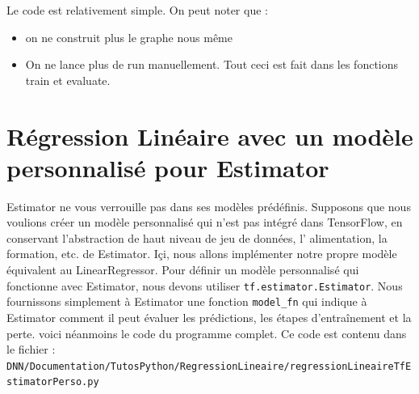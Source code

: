 Le code est relativement simple. On peut noter que :
\begin{itemize}
\item on ne construit plus le graphe nous même
\item On ne lance plus de run manuellement. Tout ceci est fait dans les fonctions train et evaluate.
\end{itemize}

\section{Régression Linéaire avec un modèle personnalisé pour Estimator}
Estimator ne vous verrouille pas dans ses modèles prédéfinis. Supposons que nous voulions créer un modèle personnalisé qui n'est pas intégré dans TensorFlow, en conservant  l'abstraction de haut niveau de jeu de données, l' alimentation, la formation, etc. de Estimator. Içi, nous allons implémenter notre propre modèle équivalent au LinearRegressor.
Pour définir un modèle personnalisé qui fonctionne avec Estimator, nous devons utiliser \verb+tf.estimator.Estimator+.  Nous fournissons simplement à Estimator une fonction \verb+model_fn+ qui indique à Estimator comment il peut évaluer les prédictions, les étapes d'entraînement et la perte. voici néanmoins le code du programme complet. Ce code est contenu dans le fichier :\\
\verb+DNN/Documentation/TutosPython/RegressionLineaire/regressionLineaireTfEstimatorPerso.py+


